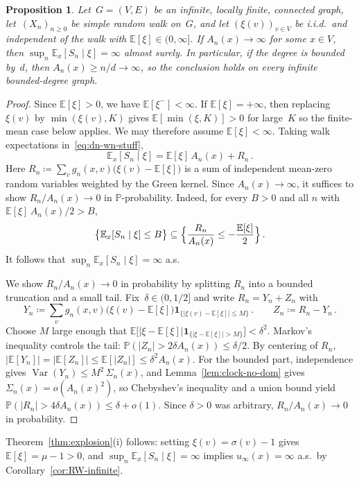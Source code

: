 \documentclass[11pt]{amsart}
\theoremstyle{plain}
\newtheorem{proposition}[theorem]{Proposition}
\theoremstyle{definition}
\newcommand{\E}{\mathbb{E}}
\renewcommand{\P}{\mathbb{P}}
\newcommand{\one}{\mathbf{1}}
\DeclareMathOperator{\var}{Var}
\begin{document}
	\begin{proposition}\label{prop:supercritical}
		Let~$G = (V,E)$ be an infinite, locally finite, connected graph, let~$(X_n)_{n\geq 0}$ be simple random walk on~$G$, and let $(\xi(v))_{v\in V}$ be i.i.d.\ and independent of the walk with
		$\E[\xi] \in (0, \infty]$. If $A_n(x)\to\infty$ for some $x\in V$, then $\sup_n\E_x[S_n\mid\xi]=\infty$ almost surely.
		In particular, if the degree is bounded by~$d$, then $A_n(x)\geq n/d\to\infty$, so the conclusion holds on every infinite bounded-degree graph.
	\end{proposition}
	\begin{proof}
		Since $\E[\xi]>0$, we have $\E[\xi^-]<\infty$. If $\E[\xi]=+\infty$, then replacing $\xi(v)$ by $\min(\xi(v),K)$ gives $\E[\min(\xi,K)]>0$ for large~$K$ so the finite-mean case below applies. We may therefore assume $\E[\xi]<\infty$. Taking walk expectations in~\eqref{eq:dn-wn-stuff},
		\[
		\E_x[S_n \mid \xi] = \E[\xi]\,A_n(x) + R_n\,.
		\]
		Here $R_n \coloneqq \sum_{v} g_n(x,v)\bigl(\xi(v)-\E[\xi]\bigr)$ is a sum of independent mean-zero random variables weighted by the Green kernel. Since $A_n(x)\to\infty$, it suffices to show $R_n/A_n(x) \to 0$ in $\P$-probability. Indeed, for every $B > 0$ and all $n$ with $\E[\xi]\, A_n(x)/2>B$,
		\[
		\bigl\{\E_x[S_n\mid\xi] \leq B\bigr\} \subseteq \Bigl\{\frac{R_n}{A_n(x)} \leq -\frac{\E[\xi]}{2}\Bigr\}\,.
		\]
		It follows that $\sup_n \E_x[S_n\mid\xi] = \infty$ a.s.
		
		We show $R_n/A_n(x)\to 0$ in probability by splitting $R_n$ into a bounded truncation and a small tail. Fix~$\delta \in (0,1/2]$ and write $R_n = Y_n + Z_n$ with
		\[Y_n \coloneqq \sum_{v} g_n(x,v)\bigl(\xi(v)-\E[\xi]\bigr)\one_{\{|\xi(v)-\E[\xi]|\leq M\}}\,.
		\qquad
		Z_n \coloneqq R_n - Y_n\,.
		\]
		Choose $M$ large enough that $\E\bigl[|\xi - \E[\xi]| \one_{\{|\xi-\E[\xi]|>M\}}\bigr] < \delta^2$.
		Markov's inequality controls the tail: $\P(|Z_n| > 2\delta A_n(x)) \leq \delta/2$. By centering of $R_n$, $|\E[Y_n]|=|\E[Z_n]|\leq\E[|Z_n|]\leq\delta^2 A_n(x)$. For the bounded part, independence gives $\var(Y_n)\leq M^2\,\Sigma_n(x)$, and Lemma~\ref{lem:clock-no-dom} gives $\Sigma_n(x)=o(A_n(x)^2)$, so Chebyshev's inequality and a union bound yield $\P(|R_n| > 4\delta A_n(x)) \leq \delta+o(1)$. Since $\delta > 0$ was arbitrary, $R_n/A_n(x) \to 0$ in probability.
	\end{proof}
	
	Theorem~\ref{thm:explosion}(i) follows: setting $\xi(v)=\sigma(v)-1$ gives $\E[\xi]=\mu-1>0$, and $\sup_n\E_x[S_n\mid\xi]=\infty$ implies $u_\infty(x)=\infty$ a.s.\ by Corollary~\ref{cor:RW-infinite}.
	
\end{document}
